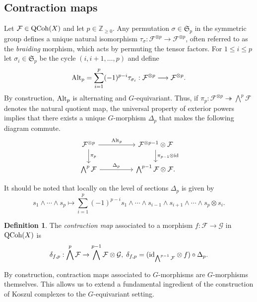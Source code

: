 \documentclass[10pt]{amsart}
\theoremstyle{definition}
\newtheorem{definition}[theorem]{Definition}
\begin{document}
\subsection{Contraction maps}
Let $\mathcal{F}\in{\rm QCoh}(X)$ and let $p\in\mathbb{Z}_{\geq 0}$. Any permutation $\sigma\in\mathfrak{S}_p$ in the symmetric group defines a unique natural isomorphism $\tau_\sigma: \mathcal{F}^{\otimes p} \rightarrow \mathcal{F}^{\otimes p}$, often referred to as the {\em braiding} morphism, which acts by permuting the tensor factors. For $1\leq i\leq p$ let $\sigma_i\in\mathfrak{S}_p$ be the cycle $(i,i+1,\ldots,p)$ and define
\[
{\rm Alt}_p=\sum_{i=1}^p(-1)^{p-i} \tau_{\sigma_i} :\mathcal{F}^{\otimes p} \longrightarrow \mathcal{F}^{\otimes p}.
\]
By construction, ${\rm Alt}_p$ is alternating and $G$-equivariant. Thus, if $\pi_p:\mathcal{F}^{\otimes p}\twoheadrightarrow \bigwedge^p\mathcal{F}$ denotes the natural quotient map, the universal property of exterior powers implies that there exists a unique $G$-morphism $\Delta_p$ that makes the following diagram commute.
\[
\begin{tikzcd}[column sep=huge]
\mathcal{F}^{\otimes p} \arrow[r, "{\rm Alt}_p"] \arrow[d, "\pi_p"] & \mathcal{F}^{\otimes p-1} \otimes \mathcal{F} \arrow[d, "\pi_{p-1} \otimes \text{id}"] \\
\bigwedge^p \mathcal{F} \arrow[r, "\Delta_p"] & \bigwedge^{p-1} \mathcal{F} \otimes \mathcal{F}.
\end{tikzcd}
\]

It should be noted that locally on the level of sections $\Delta_p$ is given by
\[
s_1\wedge\cdots\wedge s_p\mapsto \sum_{i=1}^{p}(-1)^{p-i}s_1\wedge\cdots\wedge s_{i-1}\wedge s_{i+1}\wedge\cdots \wedge s_p \otimes s_i.
\]
\begin{definition}\label{def:contr}
The {\em contraction map} associated to a morphism $f:\mathcal{F}\rightarrow\mathcal{G}$ in ${\rm QCoh}(X)$ is
\[
\delta_{f,p}:\bigwedge^p\mathcal{F}\rightarrow\bigwedge^{p-1}\mathcal{F}\otimes \mathcal{G},\;\delta_{f,p}=({\rm id}_{\bigwedge^{p-1}\mathcal{F}}\otimes f)\circ \Delta_p.
\]
\end{definition}

By construction, contraction maps associated to $G$-morphisms are $G$-morphisms themselves. This allows us to extend a fundamental ingredient of the construction of Koszul complexes to the $G$-equivariant setting.
\end{document}
